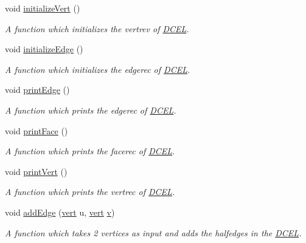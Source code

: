 \begin{DoxyCompactItemize}
void \hyperlink{class_d_c_e_l_ab53853e31a8715a783d4b92b37aabdfc}{initialize\+Vert} ()
\begin{DoxyCompactList}\small\item\em A function which initializes the vertrev of \hyperlink{class_d_c_e_l}{D\+C\+EL}. \end{DoxyCompactList}\item 
void \hyperlink{class_d_c_e_l_a84cd5349e0eda103a936e104b8cf9017}{initialize\+Edge} ()
\begin{DoxyCompactList}\small\item\em A function which initializes the edgerec of \hyperlink{class_d_c_e_l}{D\+C\+EL}. \end{DoxyCompactList}\item 
void \hyperlink{class_d_c_e_l_adbd14f5b0b02b6760ae60a2f78262aaf}{print\+Edge} ()
\begin{DoxyCompactList}\small\item\em A function which prints the edgerec of \hyperlink{class_d_c_e_l}{D\+C\+EL}. \end{DoxyCompactList}\item 
void \hyperlink{class_d_c_e_l_a02d6d3ab8652a6d7cd1bd4488bbec5de}{print\+Face} ()
\begin{DoxyCompactList}\small\item\em A function which prints the facerec of \hyperlink{class_d_c_e_l}{D\+C\+EL}. \end{DoxyCompactList}\item 
void \hyperlink{class_d_c_e_l_a6c1af27ae2c0bf06abb206e64ac517a2}{print\+Vert} ()
\begin{DoxyCompactList}\small\item\em A function which prints the vertrec of \hyperlink{class_d_c_e_l}{D\+C\+EL}. \end{DoxyCompactList}\item 
void \hyperlink{class_d_c_e_l_aed8e7593ec708470baff3e6c9da353ff}{add\+Edge} (\hyperlink{_polygon_triangulation_8h_a15bccd83c1e570e4a0ff17c42152989b}{vert} u, \hyperlink{_polygon_triangulation_8h_a15bccd83c1e570e4a0ff17c42152989b}{vert} \hyperlink{_polygon_triangulation_8h_a6ef2f6631c3d06ff06abb262179de4c1}{v})
\begin{DoxyCompactList}\small\item\em A function which takes 2 vertices as input and adds the halfedges in the \hyperlink{class_d_c_e_l}{D\+C\+EL}. \end{DoxyCompactList}\end{DoxyCompactItemize}
